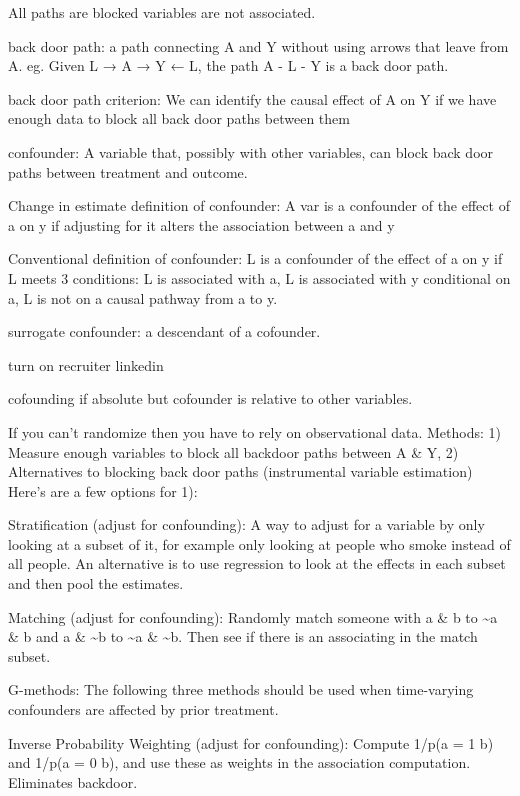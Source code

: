 \documentclass[]{book}
\begin{document}
All paths are blocked variables are not associated.

back door path: a path connecting A and Y without using arrows that leave from A. eg. Given L → A → Y ← L, the path A - L - Y is a back door path.

back door path criterion: We can identify the causal effect of A on Y if we have enough data to block all back door paths between them

confounder: A variable that, possibly with other variables, can block back door paths between treatment and outcome.

Change in estimate definition of confounder: A var is a confounder of the effect of a on y if adjusting for it alters the association between a and y

Conventional definition of confounder: L is a confounder of the effect of a on y if L meets 3 conditions: L is associated with a, L is associated with y conditional on a, L is not on a causal pathway from a to y.

surrogate confounder: a descendant of a cofounder.

turn on recruiter linkedin

cofounding if absolute but cofounder is relative to other variables.

If you can't randomize then you have to rely on observational data. Methods: 1) Measure enough variables to block all backdoor paths between A \& Y, 2) Alternatives to blocking back door paths (instrumental variable estimation) Here's are a few options for 1):

Stratification (adjust for confounding): A way to adjust for a variable by only looking at a subset of it, for example only looking at people who smoke instead of all people. An alternative is to use regression to look at the effects in each subset and then pool the estimates.

Matching (adjust for confounding): Randomly match someone with a \& b to \textasciitilde{}a \& b and a \& \textasciitilde{}b to \textasciitilde{}a \& \textasciitilde{}b. Then see if there is an associating in the match subset.

G-methods: The following three methods should be used when time-varying confounders are affected by prior treatment.

Inverse Probability Weighting (adjust for confounding): Compute 1/p(a = 1 \textbar{} b) and 1/p(a = 0 \textbar{} b), and use these as weights in the association computation. Eliminates backdoor.
\end{document}
